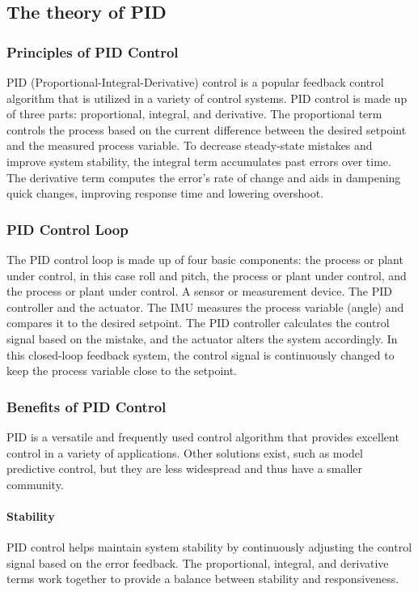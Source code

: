 \subsection{The theory of PID}

\subsubsection{Principles of PID Control}

PID (Proportional-Integral-Derivative) control is a popular feedback control algorithm that is utilized in a variety of control systems. PID control is made up of three parts: proportional, integral, and derivative. The proportional term controls the process based on the current difference between the desired setpoint and the measured process variable. To decrease steady-state mistakes and improve system stability, the integral term accumulates past errors over time. The derivative term computes the error's rate of change and aids in dampening quick changes, improving response time and lowering overshoot. \cite{PIDbook}
\subsubsection{PID Control Loop}

The PID control loop is made up of four basic components: the process or plant under control, in this case roll and pitch, the process or plant under control, and the process or plant under control. A sensor or measurement device. The PID controller and the actuator. The IMU measures the process variable (angle) and compares it to the desired setpoint. The PID controller calculates the control signal based on the mistake, and the actuator alters the system accordingly. In this closed-loop feedback system, the control signal is continuously changed to keep the process variable close to the setpoint. \cite{PIDbook}
\subsubsection{Benefits of PID Control}

PID is a versatile and frequently used control algorithm that provides excellent control in a variety of applications. Other solutions exist, such as model predictive control, but they are less widespread and thus have a smaller community. \cite{Efheij2019}

\paragraph{Stability}PID control helps maintain system stability by continuously adjusting the control signal based on the error feedback. The proportional, integral, and derivative terms work together to provide a balance between stability and responsiveness. \cite{PIDbook}
